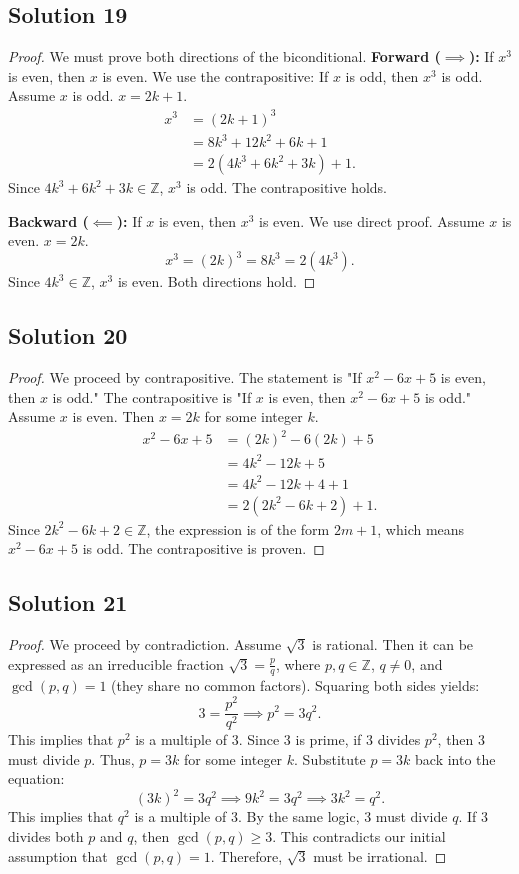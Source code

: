 \documentclass[11pt]{article}
\begin{document}
\subsection{Solution 19}
\begin{proof}
We must prove both directions of the biconditional.
\textbf{Forward ($\implies$):} If $x^3$ is even, then $x$ is even.
We use the contrapositive: If $x$ is odd, then $x^3$ is odd.
Assume $x$ is odd. $x = 2k+1$.
\begin{align*}
x^3 &= (2k+1)^3 \\
&= 8k^3 + 12k^2 + 6k + 1 \\
&= 2(4k^3 + 6k^2 + 3k) + 1.
\end{align*}
Since $4k^3 + 6k^2 + 3k \in \mathbb{Z}$, $x^3$ is odd. The contrapositive holds.

\textbf{Backward ($\impliedby$):} If $x$ is even, then $x^3$ is even.
We use direct proof. Assume $x$ is even. $x = 2k$.
\[ x^3 = (2k)^3 = 8k^3 = 2(4k^3). \]
Since $4k^3 \in \mathbb{Z}$, $x^3$ is even. Both directions hold.
\end{proof}

\subsection{Solution 20}
\begin{proof}
We proceed by contrapositive. The statement is "If $x^2 - 6x + 5$ is even, then $x$ is odd." The contrapositive is "If $x$ is even, then $x^2 - 6x + 5$ is odd."
Assume $x$ is even. Then $x = 2k$ for some integer $k$.
\begin{align*}
x^2 - 6x + 5 &= (2k)^2 - 6(2k) + 5 \\
&= 4k^2 - 12k + 5 \\
&= 4k^2 - 12k + 4 + 1 \\
&= 2(2k^2 - 6k + 2) + 1.
\end{align*}
Since $2k^2 - 6k + 2 \in \mathbb{Z}$, the expression is of the form $2m + 1$, which means $x^2 - 6x + 5$ is odd. The contrapositive is proven.
\end{proof}

\subsection{Solution 21}
\begin{proof}
We proceed by contradiction. Assume $\sqrt{3}$ is rational. Then it can be expressed as an irreducible fraction $\sqrt{3} = \frac{p}{q}$, where $p, q \in \mathbb{Z}$, $q \neq 0$, and $\gcd(p,q) = 1$ (they share no common factors).
Squaring both sides yields:
\[ 3 = \frac{p^2}{q^2} \implies p^2 = 3q^2. \]
This implies that $p^2$ is a multiple of $3$. Since $3$ is prime, if $3$ divides $p^2$, then $3$ must divide $p$. Thus, $p = 3k$ for some integer $k$.
Substitute $p = 3k$ back into the equation:
\[ (3k)^2 = 3q^2 \implies 9k^2 = 3q^2 \implies 3k^2 = q^2. \]
This implies that $q^2$ is a multiple of $3$. By the same logic, $3$ must divide $q$.
If $3$ divides both $p$ and $q$, then $\gcd(p,q) \ge 3$. This contradicts our initial assumption that $\gcd(p,q) = 1$. Therefore, $\sqrt{3}$ must be irrational.
\end{proof}
\end{document}
